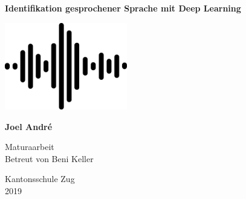 \begin{titlepage}
    \begin{center}
        \vspace*{1cm}
        
        \Huge
        \textbf{Identifikation gesprochener Sprache mit Deep Learning}
            
        \vspace{4cm}
        
        \includegraphics[width=0.4\textwidth]{assets/front.png}
        
         \vspace{4cm}
        
        \textbf{Joel André}
        \vspace{1.5cm}
        
        
        \Large
        Maturaarbeit\\
        Betreut von
        Beni Keller
        
        \vspace{0.8cm}
        
        
        Kantonsschule Zug\\
        2019
        
    \end{center}
\end{titlepage}